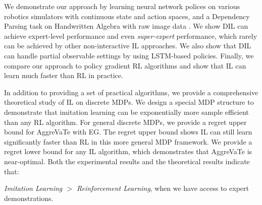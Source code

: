 \documentclass{article}
\newcommand{\BB}[1]{\textcolor{red}{\bf Byron: {#1}}}
\begin{document}
We demonstrate our approach by learning neural network polices on various robotics simulators with continuous state and action spaces, and a Dependency Parsing task on Handwritten Algebra with raw image data \cite{duyckpredicting}. We show DIL can achieve expert-level performance and even \emph{super-expert} performance, which rarely can be achieved by other non-interactive IL approaches. We also show that DIL can handle partial observable settings by using LSTM-based policies. Finally, we compare our approach to policy gradient RL algorithms and show that IL can learn much faster than RL in practice. 

In addition to providing a set of practical algorithms, we provide a comprehensive  theoretical study of IL on discrete MDPs. We design a special MDP structure to demonstrate that imitation learning can be exponentially more sample efficient than any RL algorithm. For general discrete MDPs, we provide a regret upper bound for AggreVaTe with EG. The regret upper bound shows IL can still learn significantly faster than RL in this more general MDP framework. We provide a regret lower bound for any IL algorithm, which demonstrates that AggreVaTe is near-optimal. Both the experimental results and the theoretical results indicate that: 
\begin{displayquote}
\emph{Imitation Learning $>$ Reinforcement Learning}, when we have access to expert demonstrations.
\end{displayquote}




\end{document}
